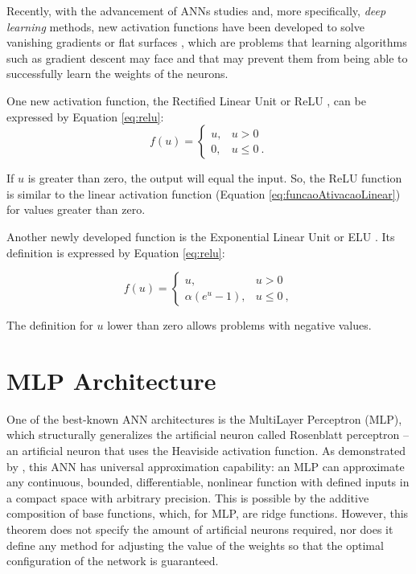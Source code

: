 Recently, with the advancement of ANNs studies and, more specifically, \textit{deep learning} methods, new activation functions have been developed to solve vanishing gradients or flat surfaces \cite{Fahlman1988}, which are problems that learning algorithms such as gradient descent may face and that may prevent them from being able to successfully learn the weights of the neurons.

One new activation function, the Rectified Linear Unit or ReLU \cite{Maas2013}, can be expressed by Equation \ref{eq:relu}:
\begin{equation}
	\label{eq:relu}
	f(u) = \left\{\begin{matrix}
		u, & u > 0    \\
		0, & u \leq 0 \:.
	\end{matrix}\right.
\end{equation}

\noindent
If $u$ is greater than zero, the output will equal the input. So, the ReLU function is similar to the linear activation function (Equation \ref{eq:funcaoAtivacaoLinear}) for values greater than zero. %

Another newly developed function is the Exponential Linear Unit or ELU \cite{Clevert2016}. Its definition is expressed by Equation \ref{eq:relu}:

\begin{equation}
	\label{eq:elu}
	f(u) = \left\{\begin{matrix}
		u,               & u > 0    \\
		\alpha(e^u - 1), & u \leq 0 \:,
	\end{matrix}\right.
\end{equation}

The definition for $u$ lower than zero allows problems with negative values.

\section{MLP Architecture}
\label{sec:mlp}

One of the best-known ANN architectures is the MultiLayer Perceptron (MLP), which structurally generalizes the artificial neuron called Rosenblatt perceptron \cite{Rosenblatt1958} -- an artificial neuron that uses the Heaviside activation function. As demonstrated by \cite{Cybenko1989}, this ANN has universal approximation capability: an MLP can approximate any continuous, bounded, differentiable, nonlinear function with defined inputs in a compact space with arbitrary precision. This is possible by the additive composition of base functions, which, for MLP, are ridge functions. However, this theorem does not specify the amount of artificial neurons required, nor does it define any method for adjusting the value of the weights so that the optimal configuration of the network is guaranteed.

